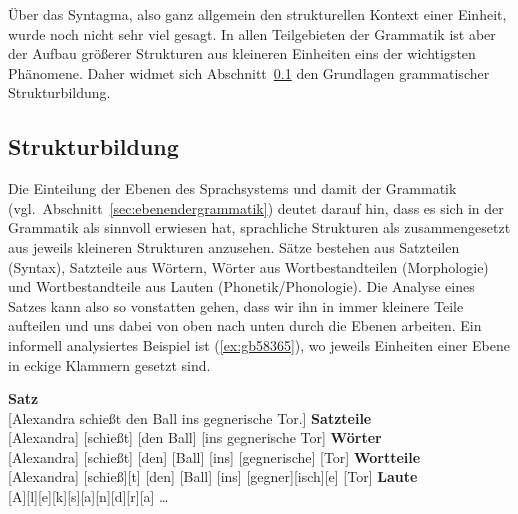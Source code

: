 
Über das Syntagma, also ganz allgemein den strukturellen Kontext einer Einheit, wurde noch nicht sehr viel gesagt.
In allen Teilgebieten der Grammatik ist aber der Aufbau größerer Strukturen aus kleineren Einheiten eins der wichtigsten Phänomene.
Daher widmet sich Abschnitt~\ref{sec:strukturbildung} den Grundlagen grammatischer Strukturbildung.

\subsection{Strukturbildung}

\label{sec:strukturbildung}

Die Einteilung der Ebenen des Sprachsystems und damit der Grammatik (vgl.\ Abschnitt~\ref{sec:ebenendergrammatik}) deutet darauf hin, dass es sich in der Grammatik als sinnvoll erwiesen hat, sprachliche Strukturen als zusammengesetzt aus jeweils kleineren Strukturen anzusehen.
Sätze bestehen aus Satzteilen (Syntax), Satzteile aus Wörtern, Wörter aus Wortbestandteilen (Morphologie) und Wortbestandteile aus Lauten (Phonetik\slash Phonologie).
Die Analyse eines Satzes kann also so vonstatten gehen, dass wir ihn in immer kleinere Teile aufteilen und uns dabei von oben nach unten durch die Ebenen arbeiten.
Ein informell analysiertes Beispiel ist (\ref{ex:gb58365}), wo jeweils Einheiten einer Ebene in eckige Klammern gesetzt sind.

\begin{exe}
  \ex\label{ex:gb58365}
  \begin{xlist}
    \ex \textbf{Satz} \\
    {[Alexandra schießt den Ball ins gegnerische Tor.]}
    \ex \textbf{Satzteile} \\
    {[Alexandra] [schießt] [den Ball] [ins gegnerische Tor]}
    \ex \textbf{Wörter} \\
    {[Alexandra] [schießt] [den] [Ball] [ins] [gegnerische] [Tor]}
    \ex \textbf{Wortteile} \\
    {[Alexandra] [schieß][t] [den] [Ball] [ins] [gegner][isch][e] [Tor]}
    \ex \textbf{Laute} \\
    {[A][l][e][k][s][a][n][d][r][a] \ldots \\}
  \end{xlist}
\end{exe}

